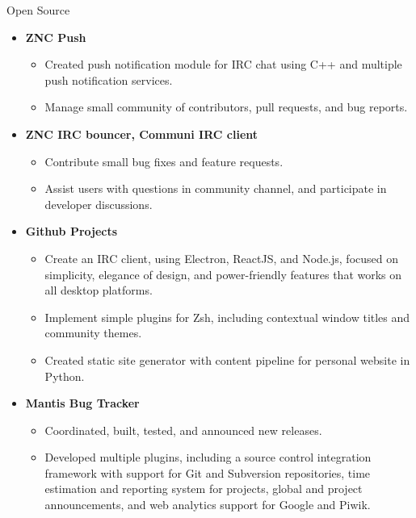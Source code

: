 \documentclass[11pt,oneside]{article}
\newenvironment{ressection}[1]{
	\vspace{8pt}
	{\fontfamily{phv}\selectfont\Large#1}
	\begin{itemize}
	\vspace{3pt}
}{
	\end{itemize}
}
\newcommand{\resitem}[1]{
	\vspace{-4pt}
	\item \begin{flushleft} #1 \end{flushleft}
}
\newcommand{\ressubitem}[1]{
	\vspace{-1pt}
	\item \begin{flushleft} #1 \end{flushleft}
}
\newenvironment{reslist}[1]{
	\resitem{\textbf{#1}}
	\vspace{-2pt}
	\begin{itemize}
}{
	\end{itemize}
}
\begin{document}
\begin{ressection}{Open Source}

	\begin{reslist}{ZNC Push}
		\ressubitem{Created push notification module for IRC chat using C++ and multiple push notification services.}
		\ressubitem{Manage small community of contributors, pull requests, and bug reports.}
	\end{reslist}

	\begin{reslist}{ZNC IRC bouncer, Communi IRC client}
		\ressubitem{Contribute small bug fixes and feature requests.}
		\ressubitem{Assist users with questions in community channel, and participate in developer discussions.}
	\end{reslist}

	\begin{reslist}{Github Projects}
		\ressubitem{Create an IRC client, using Electron, ReactJS, and Node.js, focused on simplicity, elegance
            of design, and power-friendly features that works on all desktop platforms.}
		\ressubitem{Implement simple plugins for Zsh, including contextual window titles and community themes.}
		\ressubitem{Created static site generator with content pipeline for personal website in Python.}
	\end{reslist}

	\begin{reslist}{Mantis Bug Tracker}
		\ressubitem{Coordinated, built, tested, and announced new releases.}
		\ressubitem{Developed multiple plugins, including a source control integration framework
		with support for Git and Subversion repositories, time estimation and reporting system for projects,
		global and project announcements, and web analytics support for Google and Piwik.}
	\end{reslist}



\end{ressection}
\end{document}
